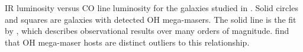 \label{fig:ohm_IR_CO} IR luminosity versus CO line luminosity for the galaxies studied in \citet{Darling_2007}. Solid circles and squares are galaxies with detected OH mega-masers. The solid line is the fit by \citet{Gao_2004}, which describes observational results over many orders of magnitude. \citet{Darling_2007} find that OH mega-maser hosts are distinct outliers to this relationship. 